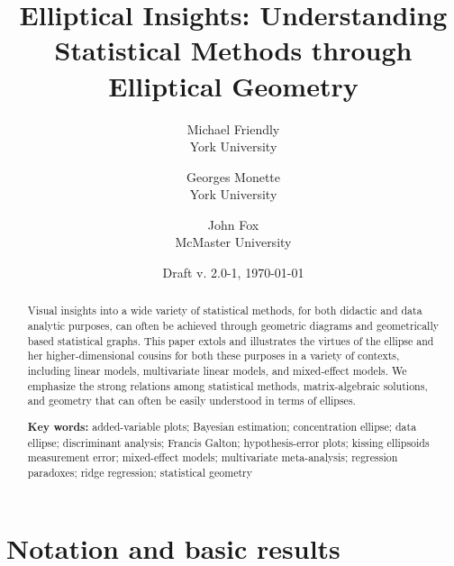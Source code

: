 \documentclass[11pt]{article}%
\newcommand{\keywords}[1]{\par\noindent\textbf{Key words:} #1}
\begin{document}
\begin{titlepage}
\title{Elliptical Insights: Understanding Statistical Methods through Elliptical Geometry}

\author{Michael Friendly%
 \\ York University
\and
Georges Monette \\ York University
\and
John Fox \\ McMaster University
}
\date{Draft v. 2.0-1, \today}
\end{titlepage}
\maketitle

\begin{abstract}
Visual insights into  a wide variety  of statistical methods,  for both didactic
and data analytic purposes, can often be achieved through geometric diagrams  and
geometrically based statistical graphs.  This  paper extols and illustrates  the
virtues  of  the  ellipse  and her  higher-dimensional  cousins  for  both these
purposes in a variety of contexts, including linear models, multivariate
linear models, and mixed-effect models.
We emphasize the strong relations among statistical methods, matrix-algebraic
solutions, and geometry that can often be easily understood in terms of
ellipses.

\keywords{
added-variable plots;
Bayesian estimation;
concentration ellipse;
data ellipse;
discriminant analysis;
Francis Galton;
hypothesis-error plots;
kissing ellipsoids
measurement error;
mixed-effect models;
multivariate meta-analysis;
regression paradoxes;
ridge regression;
statistical geometry
}
\end{abstract}



\section{Notation and basic results}\label{sec:notation}
\end{document}
